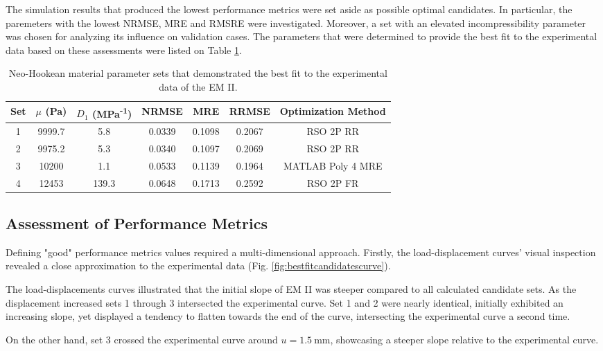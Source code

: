 The simulation results that produced the lowest performance metrics were set aside as possible
optimal candidates. In particular, the paremeters with the lowest NRMSE, MRE and RMSRE were  
investigated. Moreover, a set with an elevated incompressibility parameter was chosen for 
analyzing its influence on validation cases.
The parameters that were determined to provide the best fit to the 
experimental data based on these assessments were listed on Table \ref{tab:materialsetbestfit}.
\begin{table}[h!]
    \centering
    \begin{tabular}{|c|c|c|c|c|c|c|}
    \hline
    Set & $\mu$ (Pa) & $D_1$ (MPa\textsuperscript{-1}) & NRMSE & MRE & RRMSE & Optimization Method\\
    \hline
    1 & 9999.7 & 5.8 & 0.0339 & 0.1098 & 0.2067 & RSO 2P RR\\
    2 & 9975.2 & 5.3 & 0.0340 & 0.1097 & 0.2069 & RSO 2P RR\\
    3 & 10200 & 1.1 & 0.0533 & 0.1139 & 0.1964 & MATLAB Poly 4 MRE\\
    4 & 12453 & 139.3 & 0.0648 & 0.1713 & 0.2592 & RSO 2P FR\\
    \hline
    \end{tabular}
    \caption[Best material parameter sets]{Neo-Hookean material parameter sets that demonstrated the best fit to the experimental data of the EM II.}
	\label{tab:materialsetbestfit}
\end{table}

\subsection*{Assessment of Performance Metrics}
Defining "good" performance metrics values required a multi-dimensional approach. 
Firstly, the load-displacement curves' visual inspection revealed a close approximation 
to the experimental data (Fig. \ref{fig:bestfitcandidatescurve}).

The load-displacements curves illustrated that the initial slope of EM II was steeper compared to 
all calculated candidate sets. As the displacement increased sets \SI{1}{} through \SI{3}{} intersected 
the experimental curve. Set \SI{1}{} and \SI{2}{} were nearly identical, initially exhibited an increasing 
slope, yet displayed a tendency to flatten towards the end of the curve, intersecting the experimental curve 
a second time.

On the other hand, set \SI{3}{} crossed the experimental curve around $u=\SI{1.5}{\milli \meter}$, showcasing 
a steeper slope relative to the experimental curve. 

